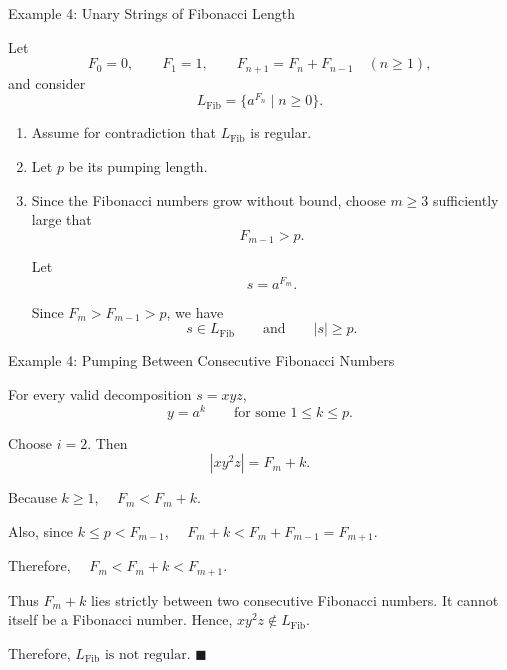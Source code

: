 \documentclass[10pt,aspectratio=169]{beamer}
\begin{document}
\begin{frame}{Example 4: Unary Strings of Fibonacci Length}

\small
Let
\[
F_0=0,\qquad F_1=1,\qquad
F_{n+1}=F_n+F_{n-1}\quad(n\geq 1),
\]
and consider
\[
L_{\mathrm{Fib}}
=
\{a^{F_n}\mid n\geq 0\}.
\]

\begin{enumerate}
    \item Assume for contradiction that \(L_{\mathrm{Fib}}\) is regular.

    \item Let \(p\) be its pumping length.

    \item Since the Fibonacci numbers grow without bound, choose
    \(m\geq 3\) sufficiently large that
    \[
    F_{m-1}>p.
    \]

    Let
    \[
    s=a^{F_m}.
    \]

    Since \(F_m>F_{m-1}>p\), we have
    \[
    s\in L_{\mathrm{Fib}}
    \qquad\text{and}\qquad
    |s|\geq p.
    \]
\end{enumerate}

\end{frame}

\begin{frame}{Example 4: Pumping Between Consecutive Fibonacci Numbers}

\small
For every valid decomposition \(s=xyz\),
\[
y=a^k
\qquad\text{for some }1\leq k\leq p.
\]

Choose \(i=2\). Then
\[
|xy^2z|=F_m+k.
\]

Because \(k\geq 1\),
\(\quad
F_m<F_m+k.
\)

Also, since \(k\leq p<F_{m-1}\),
\(\quad
F_m+k
<
F_m+F_{m-1}
=
F_{m+1}.
\)

Therefore,
\(\quad
F_m<F_m+k<F_{m+1}.
\)

Thus \(F_m+k\) lies strictly between two consecutive Fibonacci
numbers. It cannot itself be a Fibonacci number. Hence,
\(
xy^2z\notin L_{\mathrm{Fib}}.
\)

Therefore,
\(
\boxed{L_{\mathrm{Fib}}\text{ is not regular}.}
\)
\hfill\(\blacksquare\)

\end{frame}
\end{document}
